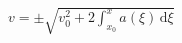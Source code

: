 \documentclass[border=2.5pt]{standalone}
\begin{document}
$\displaystyle v=\pm\sqrt{v_0^2+2\int_{x_0}^x a(\xi)\,\mathrm d\xi}$
\end{document}
